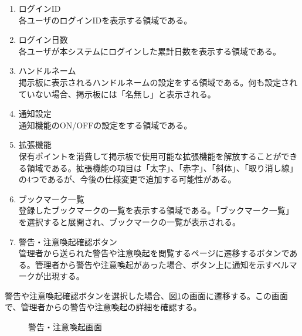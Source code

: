 \documentclass[a4j]{jarticle}
\begin{document}
\begin{enumerate}
  \renewcommand{\labelenumi}{\textcircled{\scriptsize \theenumi}}

  \item ログインID\\
  各ユーザのログインIDを表示する領域である。
  \item ログイン日数\\
  各ユーザが本システムにログインした累計日数を表示する領域である。
  \item ハンドルネーム\\
  掲示板に表示されるハンドルネームの設定をする領域である。何も設定されていない場合、掲示板には「名無し」と表示される。
  \item 通知設定\\
  通知機能のON/OFFの設定をする領域である。
  \item 拡張機能\\
  保有ポイントを消費して掲示板で使用可能な拡張機能を解放することができる領域である。拡張機能の項目は「太字」、「赤字」、「斜体」、「取り消し線」の4つであるが、今後の仕様変更で追加する可能性がある。
  \item ブックマーク一覧\\
  登録したブックマークの一覧を表示する領域である。「ブックマーク一覧」を選択すると展開され、ブックマークの一覧が表示される。
  \item 警告・注意喚起確認ボタン\\
  管理者から送られた警告や注意喚起を閲覧するページに遷移するボタンである。管理者から警告や注意喚起があった場合、ボタン上に通知を示すベルマークが出現する。
\end{enumerate}

警告や注意喚起確認ボタンを選択した場合、図\ref{fig:read_warning}の画面に遷移する。この画面で、管理者からの警告や注意喚起の詳細を確認する。

\begin{figure}[H]
\centering
{}
\caption{警告・注意喚起画面}
\label{fig:read_warning}
\end{figure}
\end{document}
